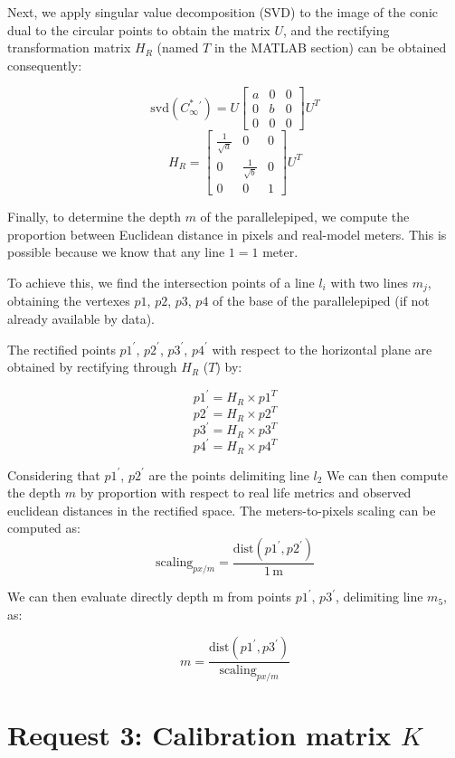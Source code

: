 \documentclass{Configuration_Files/PoliMi3i_thesis}
\begin{document}
\noindent
Next, we apply singular value decomposition (SVD) to the image of the conic dual to the circular points to obtain the matrix \(U\), and the rectifying transformation matrix \(H_{R}\) (named $T$ in the MATLAB section) can be obtained consequently:

\[
\text{svd}(C^{*}_{\infty}{}^{\prime}) = U \begin{bmatrix} a & 0 & 0 \\ 0 & b & 0 \\ 0 & 0 & 0 \end{bmatrix} U^{T}  
\]
\[
H_{R} = \begin{bmatrix} \frac{1}{\sqrt{a}} & 0 & 0 \\ 0 & \frac{1}{\sqrt{b}} & 0 \\ 0 & 0 & 1 \end{bmatrix} U^{T}  
\]

\noindent
Finally, to determine the depth \(m\) of the parallelepiped, we compute the proportion between Euclidean distance in pixels and real-model meters. This is possible because we know that any line \(1 = 1\) meter.

\noindent
To achieve this, we find the intersection points of a line \(l_{i}\) with two lines \(m_{j}\), obtaining the vertexes \(p1\), \(p2\), \(p3\), \(p4\) of the base of the parallelepiped (if not already available by data).

\noindent
The rectified points \(p1^{\prime}\), \(p2^{\prime}\), \(p3^{\prime}\), \(p4^{\prime}\) with respect to the horizontal plane are obtained by rectifying through \(H_{R}\) ($T$) by:

\[
p1^{\prime} = H_{R} \times p1^{T} 
\]
\[
p2^{\prime} = H_{R} \times p2^{T} 
\]
\[
p3^{\prime} = H_{R} \times p3^{T} 
\]
\[
p4^{\prime} = H_{R} \times p4^{T} 
\]

\noindent
Considering that \(p1^{\prime}\), \(p2^{\prime}\) are the points delimiting line \(l_{2}\) We can then compute the depth $m$ by proportion with respect to real life metrics and observed euclidean distances in the rectified space. The meters-to-pixels scaling can be computed as:
\[
\text{scaling}_{px/m} = \frac{\text{dist}(p1^{\prime}, p2^{\prime})}{1\,\text{m}}  
\]

We can then evaluate directly depth m from points \(p1^{\prime}\), \(p3^{\prime}\), delimiting line \(m_{5}\), as:

\[
m = \frac{\text{dist}(p1^{\prime}, p3^{\prime})}{\text{scaling}_{px/m}}  
\]

\newpage
\section{Request 3: Calibration matrix \(K\)}
\end{document}
